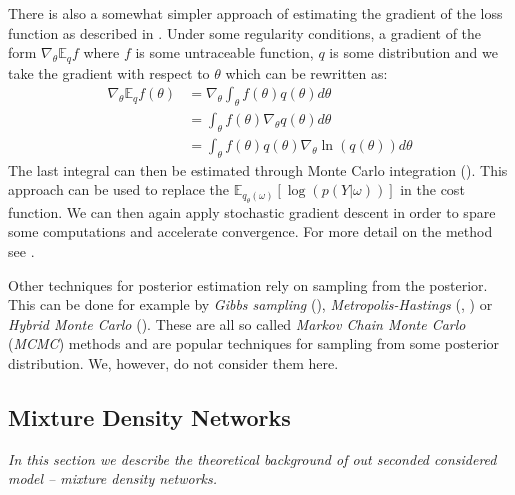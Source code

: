 \documentclass[12pt,a4paper,twoside]{scrartcl}
\numberwithin{equation}{section}
\begin{document}
There is also a somewhat simpler approach of estimating the gradient of the loss function as described in \cite{paisley2012}. Under some regularity conditions, a gradient of the form \(\nabla_{\theta}\mathbb{E}_qf \) where \(f \) is some untraceable function, \(q\) is some distribution and we take the gradient with respect to \(\theta\) which can be rewritten as:
\begin{align}
  \nabla_{\theta}\mathbb{E}_qf(\theta) &= \nabla_{\theta}\int_{\theta} f(\theta)q(\theta)d\theta \\
                                       &= \int_{\theta} f(\theta) \nabla_{\theta}q(\theta)d\theta \\
                                       &= \int_{\theta} f(\theta)q(\theta) \nabla_{\theta}\ln(q(\theta)) d\theta
\end{align}
The last integral can then be estimated through Monte Carlo integration (\cite{hammersley1964}). This approach can be used to replace the \(\mathbb{E}_{q_{\theta}(\omega)}[\log(p(Y|\omega))]\) in the cost function. We can then again apply stochastic gradient descent in order to spare some computations and accelerate convergence. For more detail on the method see \cite{paisley2012}.

Other techniques for posterior estimation rely on sampling from the posterior. This can be done for example by \emph{Gibbs sampling} (\cite{geman1984}), \emph{Metropolis-Hastings} (\cite{metropolis1953}, \cite{hastings1970}) or \emph{Hybrid Monte Carlo} (\cite{duane1987}). These are all so called \emph{Markov Chain Monte Carlo} (\emph{MCMC}) methods and are popular techniques for sampling from some posterior distribution. We, however, do not consider them here.
\subsection{Mixture Density Networks}\label{sec:mdn}
\emph{In this section we describe the theoretical background of out seconded considered model -- mixture density networks.}
\end{document}
